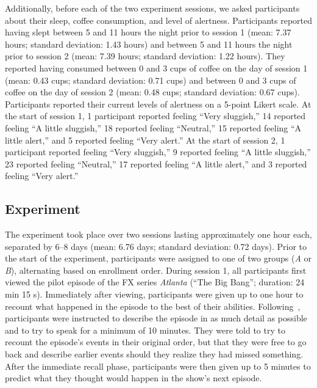 \documentclass[10pt]{article}
\begin{document}
Additionally, before each of the two experiment sessions, we asked participants about their sleep, coffee consumption, and level of alertness. 
Participants reported having slept between 5 and 11 hours the night prior to session 1 (mean: 7.37 hours; standard deviation: 1.43 hours) and between 5 and 11 hours the night prior to session 2 (mean: 7.39 hours; standard deviation: 1.22 hours). 
They reported having consumed between 0 and 3 cups of coffee on the day of session 1 (mean: 0.43 cups; standard deviation: 0.71 cups) and between 0 and 3 cups of coffee on the day of session 2 (mean: 0.48 cups; standard deviation: 0.67 cups).
Participants reported their current levels of alertness on a 5-point Likert scale. At the start of session 1, 1 participant reported feeling ``Very sluggish,'' 14 reported feeling ``A little sluggish,'' 18 reported feeling ``Neutral,'' 15 reported feeling ``A little alert,'' and 5 reported feeling ``Very alert.'' At the start of session 2, 1 participant reported feeling ``Very sluggish,'' 9 reported feeling ``A little sluggish,'' 23 reported feeling ``Neutral,'' 17 reported feeling ``A little alert,'' and 3 reported feeling ``Very alert.''


\subsection*{Experiment}\label{subsec:experiment}

The experiment took place over two sessions lasting approximately one hour each, separated by 6--8 days (mean: 6.76 days; standard deviation: 0.72 days).
Prior to the start of the experiment, participants were assigned to one of two groups (\textit{A} or \textit{B}), alternating based on enrollment order.
During session 1, all participants first viewed the pilot episode of the FX series \textit{Atlanta} (``The Big Bang''; duration: 24 min 15 s).
Immediately after viewing, participants were given up to one hour to recount what happened in the episode to the best of their abilities.
Following~\cite{ChenEtal17}, participants were instructed to describe the episode in as much detail as possible and to try to speak for a minimum of 10 minutes.
They were told to try to recount the episode's events in their original order, but that they were free to go back and describe earlier events should they realize they had missed something.
After the immediate recall phase, participants were then given up to 5 minutes to predict what they thought would happen in the show's next episode.
\end{document}
